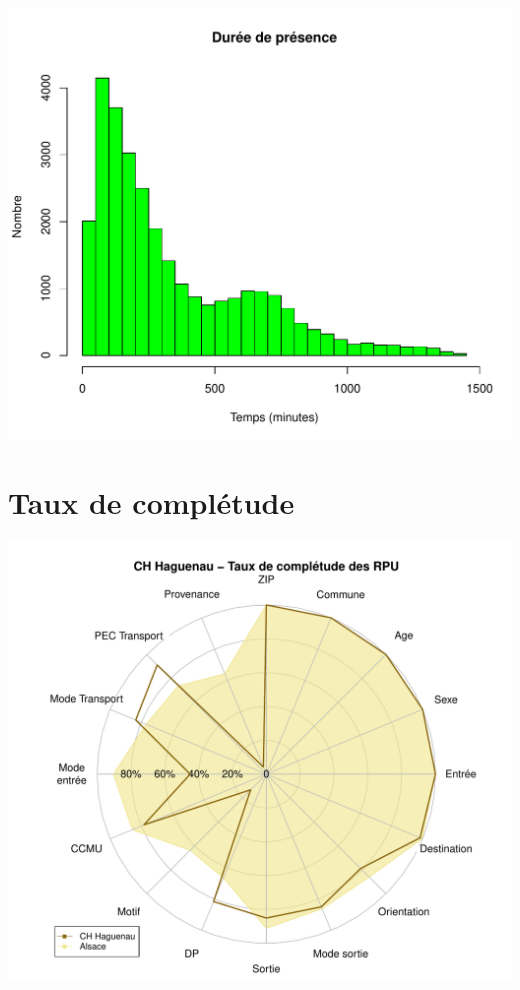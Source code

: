 \documentclass[12pt,english,french,twoside]{book}\usepackage[]{graphicx}\usepackage[]{color}
\makeatletter
\def\maxwidth{ %
  \ifdim\Gin@nat@width>\linewidth
    \linewidth
  \else
    \Gin@nat@width
  \fi
}
\newenvironment{knitrout}{}{} %
\makeatother
\begin{document}
\begin{knitrout}
\color{fgcolor}
\includegraphics[width=\maxwidth]{figure/graphe_hag-1} 

\end{knitrout}

\section*{Taux de complétude}

\begin{knitrout}
\color{fgcolor}
\includegraphics[width=\maxwidth]{figure/compl_hag-1} 

\end{knitrout}
\end{document}
